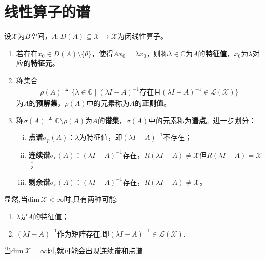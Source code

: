 \documentclass[../../main.tex]{subfiles}%
\begin{document}
\section{线性算子的谱}

\begin{definition}
设$\mathscr{X}$为$B$空间，$A:D(A)\subseteq\mathscr{X}\to\mathscr{X}$为闭线性算子。
\begin{enumerate}[(1)]
\item 若存在$x_0\in D(A)\setminus\{\theta\}$，使得$Ax_0=\lambda x_0$，则称$\lambda\in\mathbb{C}$为$A$的\textbf{特征值}，$x_0$为$\lambda$对应的\textbf{特征元}。
\item 称集合
\begin{align*}
\rho(A)\triangleq\{\lambda\in\mathbb{C}\mid (\lambda I-A)^{-1}\text{存在且}(\lambda I-A)^{-1}\in\mathscr{L}(\mathscr{X})\}
\end{align*}
为$A$的\textbf{预解集}，$\rho(A)$中的元素称为$A$的\textbf{正则值}。
\item 称$\sigma(A)\triangleq\mathbb{C}\setminus\rho(A)$为$A$的\textbf{谱集}，$\sigma(A)$中的元素称为\textbf{谱点}。进一步划分：
\begin{enumerate}[(i)]
\item \textbf{点谱}$\sigma_p(A)$：$\lambda$为特征值，即$(\lambda I-A)^{-1}$不存在；
\item \textbf{连续谱}$\sigma_c(A)$：$(\lambda I-A)^{-1}$存在，$R(\lambda I-A)\neq\mathscr{X}$但$\overline{R(\lambda I-A)}=\mathscr{X}$；
\item \textbf{剩余谱}$\sigma_r(A)$：$(\lambda I-A)^{-1}$存在，$\overline{R(\lambda I-A)}\neq\mathscr{X}$。
\end{enumerate}
\end{enumerate}
\end{definition}
\begin{remark}
显然,当$\text{dim}\,\mathscr{X}<\infty$时,只有两种可能:
\begin{enumerate}
\item $\lambda$是$A$的特征值；

\item $(\lambda I-A)^{-1}$作为矩阵存在,即$(\lambda I-A)^{-1}\in \mathscr{L}(\mathscr{X})$.
\end{enumerate}
当$\text{dim}\,\mathscr{X}=\infty$时,就可能会出现连续谱和点谱.
\end{remark}
\end{document}

